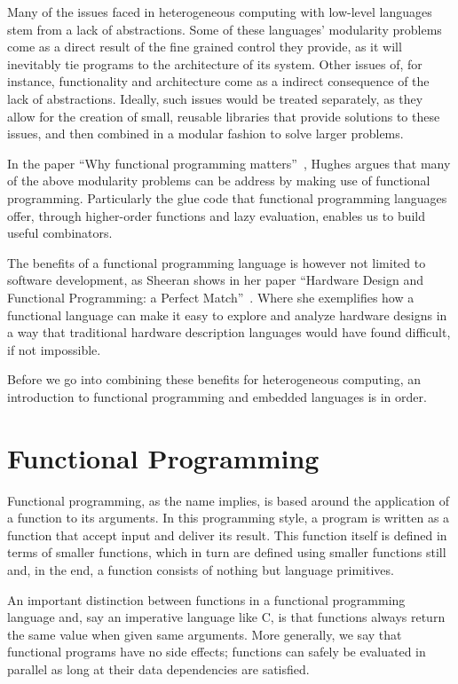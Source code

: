 \documentclass[../paper.tex]{subfiles}
\begin{document}
Many of the issues faced in heterogeneous computing with low-level languages stem from a lack of abstractions. Some of these languages' modularity problems come as a direct result of the fine grained control they provide, as it will inevitably tie programs to the architecture of its system. Other issues of, for instance, functionality and architecture come as a indirect consequence of the lack of abstractions. Ideally, such issues would be treated separately, as they allow for the creation of small, reusable libraries that provide solutions to these issues, and then combined in a modular fashion to solve larger problems.

In the paper ``Why functional programming matters''~\cite{hughes1989}, Hughes argues that many of the above modularity problems can be address by making use of functional programming. Particularly the glue code that functional programming languages offer, through higher-order functions and lazy evaluation, enables us to build useful combinators.

The benefits of a functional programming language is however not limited to software development, as Sheeran shows in her paper ``Hardware Design and Functional Programming: a Perfect Match''~\cite{sheeran2005}. Where she exemplifies how a functional language can make it easy to explore and analyze hardware designs in a way that traditional hardware description languages would have found difficult, if not impossible.

Before we go into combining these benefits for heterogeneous computing, an introduction to functional programming and embedded languages is in order.

\section{Functional Programming}
\label{functional}

Functional programming, as the name implies, is based around the application of a function to its arguments. In this programming style, a program is written as a function that accept input and deliver its result. This function itself is defined in terms of smaller functions, which in turn are defined using smaller functions still and, in the end, a function consists of nothing but language primitives.

An important distinction between functions in a functional programming language and, say an imperative language like C, is that functions always return the same value when given same arguments. More generally, we say that functional programs have no side effects; functions can safely be evaluated in parallel as long at their data dependencies are satisfied.
\end{document}
